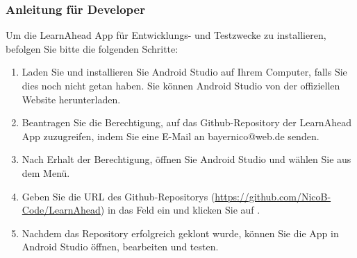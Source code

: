 \subsubsection{Anleitung für Developer}
Um die LearnAhead App für Entwicklungs- und Testzwecke zu installieren, befolgen Sie bitte die folgenden Schritte:\newline
\noindent
\begin{enumerate}
    \item Laden Sie und installieren Sie Android Studio auf Ihrem Computer, falls Sie dies noch nicht getan haben. Sie können Android Studio von der offiziellen Website herunterladen.
    \item Beantragen Sie die Berechtigung, auf das Github-Repository der LearnAhead App zuzugreifen, indem Sie eine E-Mail an bayernico@web.de senden.
    \item Nach Erhalt der Berechtigung, öffnen Sie Android Studio und wählen Sie  aus dem  Menü.
    \item Geben Sie die URL des Github-Repositorys (\href{Uhttps://github.com/NicoB-Code/LearnAheadRL}{https://github.com/NicoB-Code/LearnAhead}) in das Feld  ein und klicken Sie auf .
    \item Nachdem das Repository erfolgreich geklont wurde, können Sie die App in Android Studio öffnen, bearbeiten und testen.
\end{enumerate}

